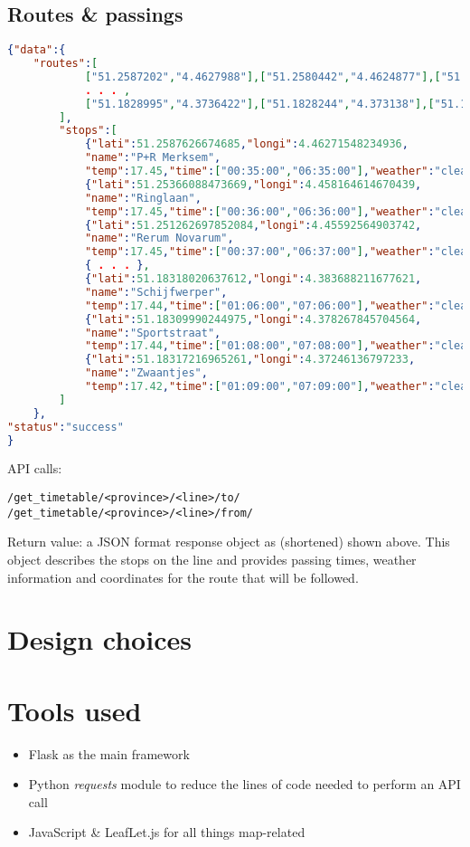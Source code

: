 \documentclass[12pt]{article}
\begin{document}
\subsection{Routes \& passings}
\begin{lstlisting}[language=json]
{"data":{
	"routes":[
			["51.2587202","4.4627988"],["51.2580442","4.4624877"],["51.2560165","4.4605994"],
			. . . ,
			["51.1828995","4.3736422"],["51.1828244","4.373138"],["51.1827684","4.3728861"]
		],
		"stops":[
			{"lati":51.2587626674685,"longi":4.46271548234936,
			"name":"P+R Merksem",
			"temp":17.45,"time":["00:35:00","06:35:00"],"weather":"clear sky"},
			{"lati":51.25366088473669,"longi":4.458164614670439,
			"name":"Ringlaan",
			"temp":17.45,"time":["00:36:00","06:36:00"],"weather":"clear sky"},
			{"lati":51.251262697852084,"longi":4.45592564903742,
			"name":"Rerum Novarum",
			"temp":17.45,"time":["00:37:00","06:37:00"],"weather":"clear sky"},
			{ . . . },
			{"lati":51.18318020637612,"longi":4.383688211677621,
			"name":"Schijfwerper",
			"temp":17.44,"time":["01:06:00","07:06:00"],"weather":"clear sky"},
			{"lati":51.18309990244975,"longi":4.378267845704564,
			"name":"Sportstraat",
			"temp":17.44,"time":["01:08:00","07:08:00"],"weather":"clear sky"},
			{"lati":51.18317216965261,"longi":4.37246136797233,
			"name":"Zwaantjes",
			"temp":17.42,"time":["01:09:00","07:09:00"],"weather":"clear sky"}
		]
	},
"status":"success"
}
\end{lstlisting}
API calls:
\begin{lstlisting}[style=DOS]
/get_timetable/<province>/<line>/to/
/get_timetable/<province>/<line>/from/
\end{lstlisting}
Return value: a JSON format response object as (shortened) shown above. This object describes the stops on the line and provides passing times, weather information and coordinates for the route that will be followed. 

\newpage

\section{Design choices}


\newpage

\section{Tools used}
\begin{itemize}
	\item Flask as the main framework
	\item Python \emph{requests} module to reduce the lines of code needed to perform an API call
	\item JavaScript \& LeafLet.js for all things map-related

\end{itemize}
\end{document}
